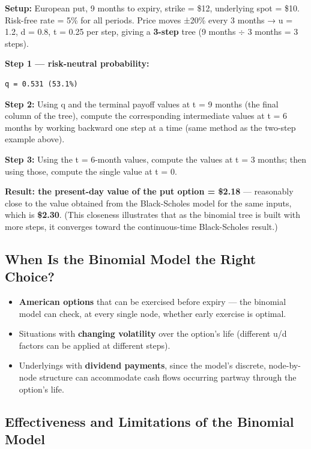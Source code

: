 \documentclass[12pt,openany]{book}
\theoremstyle{definition}
\theoremstyle{remark}
\begin{document}
\textbf{Setup:} European put, 9 months to expiry, strike = \$12, underlying spot = \$10. Risk-free rate = 5\% for all periods. Price moves ±20\% every 3 months → u = 1.2, d = 0.8, t = 0.25 per step, giving a \textbf{3-step} tree (9 months \ensuremath{\div} 3 months = 3 steps).

\textbf{Step 1 — risk-neutral probability:}
\begin{lstlisting}[style=notesCode]
q = 0.531 (53.1%)
\end{lstlisting}

\textbf{Step 2:} Using q and the terminal payoff values at t = 9 months (the final column of the tree), compute the corresponding intermediate values at t = 6 months by working backward one step at a time (same method as the two-step example above).

\textbf{Step 3:} Using the t = 6-month values, compute the values at t = 3 months; then using those, compute the single value at t = 0.

\textbf{Result: the present-day value of the put option = \$2.18} — reasonably close to the value obtained from the Black-Scholes model for the same inputs, which is \textbf{\$2.30}. (This closeness illustrates that as the binomial tree is built with more steps, it converges toward the continuous-time Black-Scholes result.)

\subsection{When Is the Binomial Model the Right Choice?}

\begin{itemize}
\item \textbf{American options} that can be exercised before expiry — the binomial model can check, at every single node, whether early exercise is optimal.
\item Situations with \textbf{changing volatility} over the option's life (different u/d factors can be applied at different steps).
\item Underlyings with \textbf{dividend payments}, since the model's discrete, node-by-node structure can accommodate cash flows occurring partway through the option's life.
\end{itemize}
\subsection{Effectiveness and Limitations of the Binomial Model}
\end{document}
